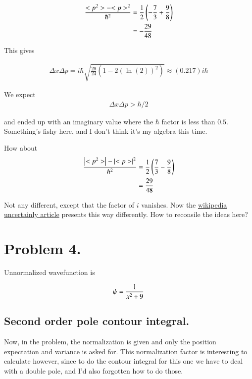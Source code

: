 \documentclass{article}
\begin{document}
\begin{align*}
\frac{<p^2>  - {<p>}^2 }{\hbar^2}
&= \frac{1}{2}\left(-\frac{7}{3} +\frac{9}{8}\right) \\
&= -\frac{29}{48}
\end{align*}

This gives 

\begin{align*}
\Delta x \Delta p = i \hbar \sqrt{\frac{29}{24}(1 - 2 (\ln(2))^2) } \approx (0.217) i \hbar
\end{align*}

We expect 
\begin{align*}
\Delta x \Delta p > \hbar/2
\end{align*}

and ended up with an imaginary value where the $\hbar$ factor is less than $0.5$.  Something's fishy here, and I
don't think it's my algebra this time.

How about
\begin{align*}
\frac{\left\lvert{<p^2>}\right\rvert  - \left\lvert{<p>}\right\rvert^2 }{\hbar^2}
&= \frac{1}{2}\left(\frac{7}{3} -\frac{9}{8}\right) \\
&= \frac{29}{48}
\end{align*}

Not any different, except that the factor of $i$ vanishes.  Now the 
\href{http://en.wikipedia.org/wiki/Uncertainty_principle#Matrix_mechanics}{wikipedia uncertainly article}
presents this way differently.  How to reconsile the ideas here?

\section{ Problem 4. }

Unnormalized wavefunction is

\begin{align*}
\psi = \frac{1}{x^2 + 9}
\end{align*}

\subsection{ Second order pole contour integral. }

Now, in the problem, the normalization is given and only the position expectation and variance is asked for.  This
normalization factor is interesting to calculate however, since to do the contour integral for this one we have to deal
with a double pole, and I'd also forgotten how to do those.
\end{document}
